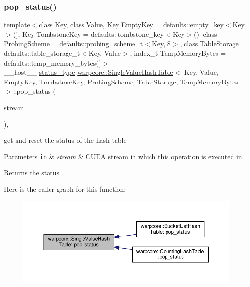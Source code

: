 \subsubsection{\texorpdfstring{pop\+\_\+status()}{pop\_status()}}
{\footnotesize\ttfamily template$<$class Key, class Value, Key Empty\+Key = defaults\+::empty\+\_\+key$<$\+Key$>$(), Key Tombstone\+Key = defaults\+::tombstone\+\_\+key$<$\+Key$>$(), class Probing\+Scheme = defaults\+::probing\+\_\+scheme\+\_\+t$<$\+Key, 8$>$, class Table\+Storage = defaults\+::table\+\_\+storage\+\_\+t$<$\+Key, Value$>$, index\+\_\+t Temp\+Memory\+Bytes = defaults\+::temp\+\_\+memory\+\_\+bytes()$>$ \\
\+\_\+\+\_\+host\+\_\+\+\_\+ \hyperlink{classwarpcore_1_1Status}{status\+\_\+type} \hyperlink{classwarpcore_1_1SingleValueHashTable}{warpcore\+::\+Single\+Value\+Hash\+Table}$<$ Key, Value, Empty\+Key, Tombstone\+Key, Probing\+Scheme, Table\+Storage, Temp\+Memory\+Bytes $>$\+::pop\+\_\+status (\begin{DoxyParamCaption}\item[{const cuda\+Stream\+\_\+t}]{stream = {} }\end{DoxyParamCaption})\hspace{0.3cm}{\ttfamily [inline]}, {\ttfamily [noexcept]}}



get and reset the status of the hash table 


\begin{DoxyParams}[1]{Parameters}
\mbox{\tt in}  & {\em stream} & C\+U\+DA stream in which this operation is executed in \\
\hline
\end{DoxyParams}
\begin{DoxyReturn}{Returns}
the status 
\end{DoxyReturn}
Here is the caller graph for this function\+:
\nopagebreak
\begin{figure}[H]
\begin{center}
\leavevmode
\includegraphics[width=350pt]{classwarpcore_1_1SingleValueHashTable_a46feca31bb400c78542b101456cd3cfe_icgraph}
\end{center}
\end{figure}
\mbox{\label{classwarpcore_1_1SingleValueHashTable_afce6914392f7c69c7ca5501b123cf167}} 

